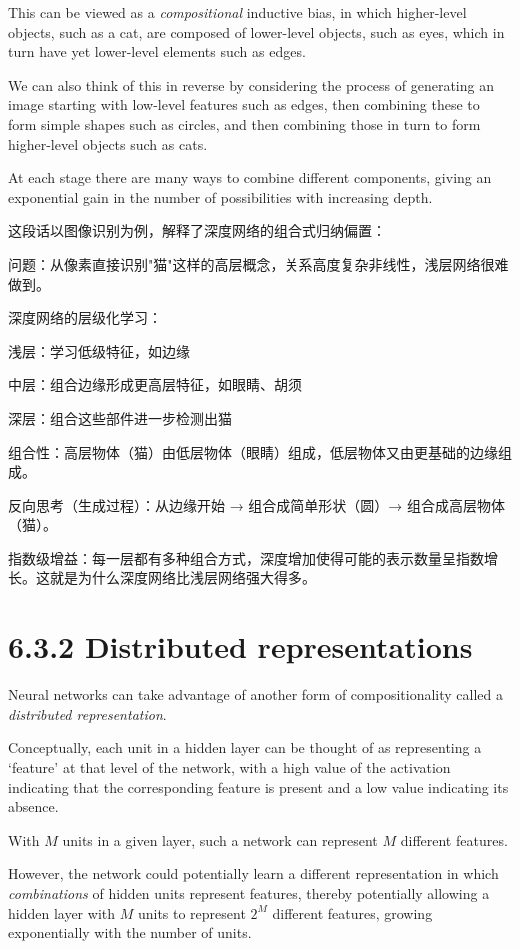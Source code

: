 \documentclass{article}
\begin{document}
This can be viewed as a \emph{compositional} inductive bias, in which higher-level objects, such as a cat, are composed of lower-level objects, such as eyes, which in turn have yet lower-level elements such as edges. 

We can also think of this in reverse by considering the process of generating an image starting with low-level features such as edges, then combining these to form simple shapes such as circles, and then combining those in turn to form higher-level objects such as cats. 

At each stage there are many ways to combine different components, giving an exponential gain in the number of possibilities with increasing depth.

{\color{red}
这段话以图像识别为例，解释了深度网络的组合式归纳偏置：

问题：从像素直接识别"猫"这样的高层概念，关系高度复杂非线性，浅层网络很难做到。

深度网络的层级化学习：

浅层：学习低级特征，如边缘

中层：组合边缘形成更高层特征，如眼睛、胡须

深层：组合这些部件进一步检测出猫

组合性：高层物体（猫）由低层物体（眼睛）组成，低层物体又由更基础的边缘组成。

反向思考（生成过程）：从边缘开始 → 组合成简单形状（圆）→ 组合成高层物体（猫）。

指数级增益：每一层都有多种组合方式，深度增加使得可能的表示数量呈指数增长。这就是为什么深度网络比浅层网络强大得多。
}

\section{6.3.2 Distributed representations}

Neural networks can take advantage of another form of compositionality called a \emph{distributed representation}. 

Conceptually, each unit in a hidden layer can be thought of as representing a `feature' at that level of the network, with a high value of the activation indicating that the corresponding feature is present and a low value indicating its absence. 

With $M$ units in a given layer, such a network can represent $M$ different features. 

However, the network could potentially learn a different representation in which \emph{combinations} of hidden units represent features, thereby potentially allowing a hidden layer with $M$ units to represent $2^M$ different features, growing exponentially with the number of units. 
\end{document}
